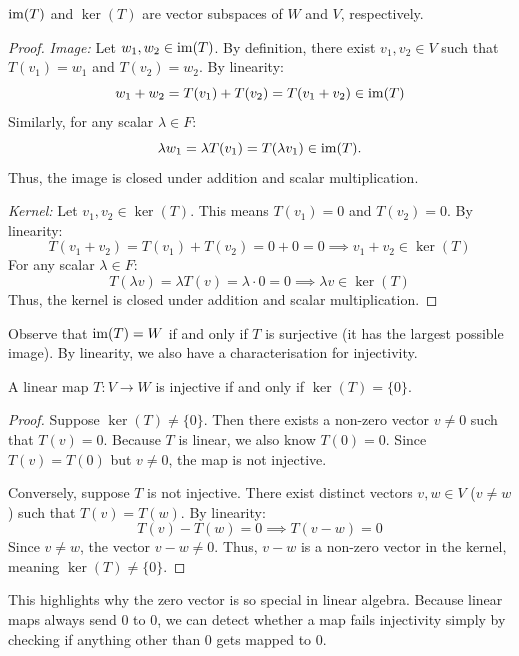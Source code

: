 \documentclass[../linear_algebra_and_groups.tex]{subfiles}
\begin{document}
\begin{proposition}
    \begin{shaded*}
        $\operatorname{im}(T)$ and $\ker(T)$ are vector subspaces of $W$ and $V$, respectively.
    \end{shaded*}
\end{proposition}
\begin{proof}
    \textit{Image:} Let $w_1, w_2 \in \operatorname{im}(T)$. By definition, there exist $v_1, v_2 \in V$ such that $T(v_1) = w_1$ and $T(v_2) = w_2$. By linearity:
    \[ w_1 + w_2 = T(v_1) + T(v_2) = T(v_1+v_2) \in \operatorname{im}(T) \]
    Similarly, for any scalar $\lambda \in F$:
    \[ \lambda w_1 = \lambda T(v_1) = T(\lambda v_1) \in \operatorname{im}(T). \]
    Thus, the image is closed under addition and scalar multiplication.

    \textit{Kernel:} Let $v_1, v_2 \in \ker(T)$. This means $T(v_1) = 0$ and $T(v_2) = 0$. By linearity:
    \[ T(v_1+v_2) = T(v_1) + T(v_2) = 0 + 0 = 0 \implies v_1+v_2 \in \ker(T) \]
    For any scalar $\lambda \in F$:
    \[ T(\lambda v) = \lambda T(v) = \lambda \cdot 0 = 0 \implies \lambda v \in \ker(T) \]
    Thus, the kernel is closed under addition and scalar multiplication.
    \qedhere
\end{proof}

Observe that $\operatorname{im}(T)=W$ if and only if $T$ is surjective (it has the largest possible image). By linearity, we also have a characterisation for injectivity.

\begin{lemma}
\label{lem:trivialkernel}
    \begin{shaded*}
        A linear map $T:V\to W$ is injective if and only if $\ker(T) = \{0\}$.
    \end{shaded*}
\end{lemma}
\begin{proof}
    Suppose $\ker(T) \ne \{0\}$. Then there exists a non-zero vector $v \ne 0$ such that $T(v) = 0$. Because $T$ is linear, we also know $T(0) = 0$. Since $T(v) = T(0)$ but $v \ne 0$, the map is not injective. 
    
    Conversely, suppose $T$ is not injective. There exist distinct vectors $v, w \in V$ ($v \ne w$) such that $T(v) = T(w)$. By linearity:
    \[ T(v) - T(w) = 0 \implies T(v-w) = 0 \]
    Since $v \ne w$, the vector $v-w \ne 0$. Thus, $v-w$ is a non-zero vector in the kernel, meaning $\ker(T) \ne \{0\}$.
    \qedhere
\end{proof}

\begin{remark}
    This highlights why the zero vector is so special in linear algebra. Because linear maps always send $0$ to $0$, we can detect whether a map fails injectivity simply by checking if anything other than $0$ gets mapped to $0$.
\end{remark}
\end{document}
